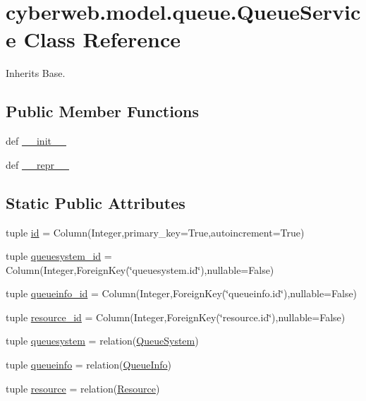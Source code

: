 \hypertarget{classcyberweb_1_1model_1_1queue_1_1_queue_service}{\section{cyberweb.\-model.\-queue.\-Queue\-Service \-Class \-Reference}
\label{classcyberweb_1_1model_1_1queue_1_1_queue_service}
}


\-Inherits \-Base.

\subsection*{\-Public \-Member \-Functions}
\begin{DoxyCompactItemize}
\item 
def \hyperlink{classcyberweb_1_1model_1_1queue_1_1_queue_service_a4757fd20a05ed8863a45a9cb8643cee2}{\-\_\-\-\_\-init\-\_\-\-\_\-}
\item 
def \hyperlink{classcyberweb_1_1model_1_1queue_1_1_queue_service_a9ba50e07fa0d5d6fdc83f8a301c3e47d}{\-\_\-\-\_\-repr\-\_\-\-\_\-}
\end{DoxyCompactItemize}
\subsection*{\-Static \-Public \-Attributes}
\begin{DoxyCompactItemize}
\item 
tuple \hyperlink{classcyberweb_1_1model_1_1queue_1_1_queue_service_ac050144cc8cf04dbb6470b349539fe98}{id} = \-Column(\-Integer,primary\-\_\-key=\-True,autoincrement=\-True)
\item 
tuple \hyperlink{classcyberweb_1_1model_1_1queue_1_1_queue_service_a9704424ca9cebb23aa848a46e2a8a9a8}{queuesystem\-\_\-id} = \-Column(\-Integer,\-Foreign\-Key(\char`\"{}queuesystem.\-id\char`\"{}),nullable=\-False)
\item 
tuple \hyperlink{classcyberweb_1_1model_1_1queue_1_1_queue_service_af2a014d03512574ee27077fe122cbbbb}{queueinfo\-\_\-id} = \-Column(\-Integer,\-Foreign\-Key(\char`\"{}queueinfo.\-id\char`\"{}),nullable=\-False)
\item 
tuple \hyperlink{classcyberweb_1_1model_1_1queue_1_1_queue_service_a9214c520eaa799da419a8fb2a8a0b52e}{resource\-\_\-id} = \-Column(\-Integer,\-Foreign\-Key(\char`\"{}resource.\-id\char`\"{}),nullable=\-False)
\item 
tuple \hyperlink{classcyberweb_1_1model_1_1queue_1_1_queue_service_a2ee4db39e5affad045e94d9c16cecf6e}{queuesystem} = relation(\hyperlink{classcyberweb_1_1model_1_1queue_1_1_queue_system}{\-Queue\-System})
\item 
tuple \hyperlink{classcyberweb_1_1model_1_1queue_1_1_queue_service_aff34299eb8ecfc33955249be5805c3e5}{queueinfo} = relation(\hyperlink{classcyberweb_1_1model_1_1queue_1_1_queue_info}{\-Queue\-Info})
\item 
tuple \hyperlink{classcyberweb_1_1model_1_1queue_1_1_queue_service_afe3030bebd4b7fe17eb1abf6391fd6d0}{resource} = relation(\hyperlink{classcyberweb_1_1model_1_1resource_1_1_resource}{\-Resource})
\end{DoxyCompactItemize}


